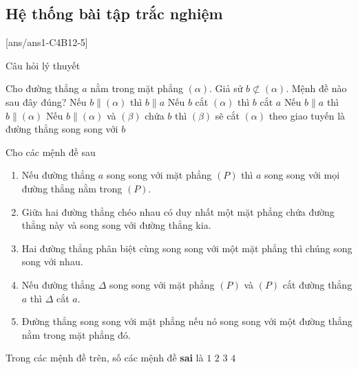 \subsection{Hệ thống bài tập trắc nghiệm}
[ans/ans1-C4B12-5]
\begin{dang}{Câu hỏi lý thuyết}
\end{dang}
	\begin{ex}%
		Cho đường thẳng $a$ nằm trong mặt phẳng $(\alpha)$. Giả sử $b \not\subset (\alpha)$. Mệnh đề nào sau đây đúng?
		\choice
		{Nếu $b \parallel (\alpha)$ thì $b \parallel a$}
		{Nếu $b$ cắt $(\alpha)$ thì $b$ cắt $a$}
		{\True Nếu $b \parallel a$ thì $b \parallel (\alpha)$}
		{Nếu $b \parallel (\alpha)$ và $(\beta)$ chứa $b$ thì $(\beta)$ sẽ cắt $(\alpha)$ theo giao tuyến là đường thẳng song song với $b$}
	\end{ex}
	\begin{ex}%
		Cho các mệnh đề sau
		\begin{enumerate}[1.]
			\item Nếu đường thẳng $a$ song song với mặt phẳng $(P)$ thì $a$ song song với mọi đường thẳng nằm trong $(P)$.
			\item Giữa hai đường thẳng chéo nhau có duy nhất một mặt phẳng chứa đường thẳng này và song song với đường thẳng kia.
			\item Hai đường thẳng phân biệt cùng song song với một mặt phẳng thì chúng song song với nhau.
			\item Nếu đường thẳng $\Delta$ song song với mặt phẳng $(P)$ và $(P)$ cắt đường thẳng $a$ thì $\Delta$ cắt $a$.
			\item Đường thẳng song song với mặt phẳng nếu nó song song với một đường thẳng nằm trong mặt phẳng đó.
		\end{enumerate}
		Trong các mệnh đề trên, số các mệnh đề \textbf{sai} là
		\choice
		{$1$}
		{$2$}
		{$3$}
		{\True $4$}
	\end{ex}

